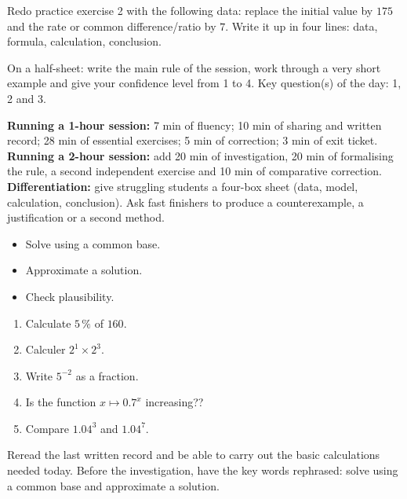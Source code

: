
\begin{dm}Redo practice exercise 2 with the following data: replace the initial value by $175$ and the rate or common difference/ratio by $7$. Write it up in four lines: data, formula, calculation, conclusion.\end{dm}

\begin{sortie}On a half-sheet: write the main rule of the session, work through a very short example and give your confidence level from 1 to 4. Key question(s) of the day: 1, 2 and 3.\end{sortie}

\ifprof
\begin{methode}
\textbf{Running a 1-hour session:} 7 min of fluency; 10 min of sharing and written record; 28 min of essential exercises; 5 min of correction; 3 min of exit ticket.\\
\textbf{Running a 2-hour session:} add 20 min of investigation, 20 min of formalising the rule, a second independent exercise and 10 min of comparative correction.\\
\textbf{Differentiation:} give struggling students a four-box sheet (data, model, calculation, conclusion). Ask fast finishers to produce a counterexample, a justification or a second method.
\end{methode}
\fi
{}
\begin{objectifs}\begin{itemize}\item Solve using a common base.\item Approximate a solution.\item Check plausibility.\end{itemize}\end{objectifs}
\begin{automatismes}\begin{enumerate}\item Calculate $5\,\%$ of $160$. \item Calculer $2^1\times2^3$. \item Write $5^{-2}$ as a fraction. \item Is the function $x\mapsto0.7^x$ increasing?? \item Compare $1.04^3$ and $1.04^7$. \end{enumerate}\end{automatismes}
\begin{prerequis}Reread the last written record and be able to carry out the basic calculations needed today. Before the investigation, have the key words rephrased: solve using a common base and approximate a solution.\end{prerequis}

